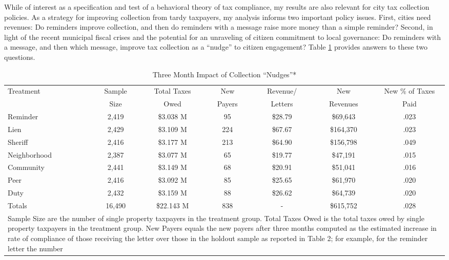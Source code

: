 While of interest as a specification and test of a behavioral theory
of tax compliance, my results are also relevant for city tax
collection policies.  As a strategy for improving collection from
tardy taxpayers, my analysis informs two important policy issues.
First, cities need revenues: Do reminders improve collection, and then
do reminders with a message raise more money than a simple reminder?
Second, in light of the recent municipal fiscal crises and the
potential for an unraveling of citizen commitment to local governance:
Do reminders with a message, and then which message, improve tax
collection as a ``nudge'' to citizen engagement? Table \ref{sh_rev}
provides answers to these two questions.


\begin{table}[htb]
\centering
\caption{Three Month Impact of Collection ``Nudges''*} 
\label{sh_rev}
\begin{adjustbox}{width=\textwidth,totalheight=0.9\textheight,keepaspectratio}
\begin{tabular}{lcccccc}
  \hline
Treatment & Sample & Total Taxes & New  & Revenue/ & New  & New \% of Taxes 
\\ 
& Size & Owed & Payers & Letters & Revenues & Paid\\
\hline
Reminder & 2,419 & \$3.038 M & 95 & \$28.79 & \$69,643 & .023\\ 
  Lien & 2,429 & \$3.109 M & 224 & \$67.67 & \$164,370 & .023 \\ 
  Sheriff & 2,416 & \$3.177 M & 213 & \$64.90 & \$156,798 & .049 \\ 
Neighborhood & 2,387 & \$3.077 M & 65 & \$19.77 & \$47,191 & .015 \\ 
  Community & 2,441 & \$3.149 M & 68 & \$20.91 & \$51,041 & .016\\ 
  Peer & 2,416 & \$3.092 M & 85 & \$25.65 & \$61,970 & .020\\ 
  Duty & 2,432 & \$3.159 M & 88 & \$26.62 & \$64,739 & .020\\ 
   \hline
   \hline
  Totals & 16,490 & \$22.143 M & 838 & - & \$615,752 & .028\\
  \hline
\multicolumn{7}{p{1\textwidth}}{\scriptsize* Sample Size are the
  number of single property taxpayers in the treatment group.  Total
  Taxes Owed is the total taxes owed by single property taxpayers in
  the treatment group. New Payers equals the new payers after three
  months computed as the estimated increase in rate of compliance of
  those receiving the letter over those in the holdout sample as
  reported in Table 2; for example, for the reminder letter the number
}
\end{tabular}
\end{adjustbox}
\end{table}
